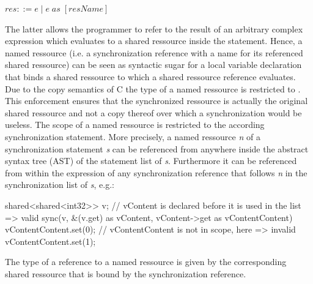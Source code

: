 $ res ::= e\;|\;e\;\mathit{as}\;[\mathit{resName}] $

The latter allows the programmer to refer to the result of an arbitrary complex expression which evaluates to a shared ressource inside the  statement. Hence, a named ressource (i.e. a synchronization reference with a name for its referenced shared ressource) can be seen as syntactic sugar for a local variable declaration that binds a shared ressource to which a shared ressource reference evaluates. Due to the copy semantics of C the type of a named ressource  is restricted to . This enforcement ensures that the synchronized ressource is actually the original shared ressource and not a copy thereof over which a synchronization would be useless. The scope of a named ressource is restricted to the according synchronization statement. More precisely, a named ressource \textit{n} of a synchronization statement \textit{s} can be referenced from anywhere inside the abstract syntax tree (AST) of the statement list of \textit{s}. Furthermore it can be referenced from within the expression of any synchronization reference that follows \textit{n} in the synchronization list of \textit{s}, e.g.:
\begin{ccode}
shared<shared<int32>> v;
// vContent is declared before it is used in the list => valid
sync(v, &(v.get) as vContent, vContent->get as vContentContent) {
  vContentContent.set(0);
}
// vContentContent is not in scope, here => invalid
vContentContent.set(1);
\end{ccode}

The type of a reference to a named ressource is given by the corresponding shared ressource that is bound by the  synchronization reference.


